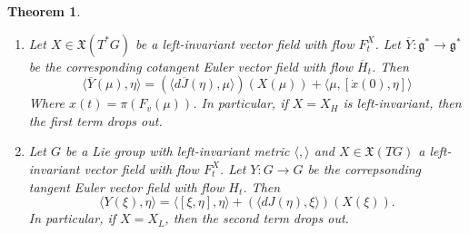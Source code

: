 \documentclass{article}
\newtheorem{thm}{Theorem}
\begin{document}
\begin{thm}

\begin{enumerate}
    \item Let $X \in \mathfrak{X}(T^*G)$ be a left-invariant vector field with flow $F^X_t$. Let $\overline{Y}: \mathfrak{g}^* \to \mathfrak{g}^*$ be the corresponding cotangent Euler vector field with flow $\overline{H}_t$. Then 
    \begin{equation}    \langle \overline{Y}(\mu), \eta \rangle = ( \langle d \overline{J}(\eta), \mu \rangle ) (X(\mu)) + \langle \mu, [\dot{x}(0), \eta] \rangle\end{equation}
    Where $x(t) = \pi (F_v(\mu))$. In particular, if $X=X_H$ is left-invariant, then the first term drops out.
    
    \item Let $G$ be a Lie group with left-invariant metric $\langle, \rangle$ and $X \in \mathfrak{X}(TG)$ a left-invariant vector field with flow $F^X_t$. Let $Y: G \to G$ be the correpsonding tangent Euler vector field with flow $H_t$. Then 
    \begin{equation}\langle Y(\xi), \eta \rangle = \langle [\xi, \eta], \eta \rangle + (\langle d J(\eta), \xi \rangle )(X(\xi)).\end{equation}
    In particular, if $X=X_L$, then the second term drops out.
\end{enumerate}
\end{thm}
\end{document}
